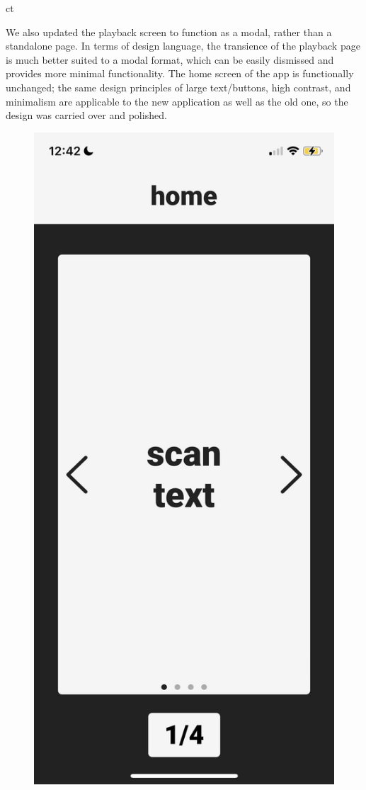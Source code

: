 ct\documentclass[a4paper,11pt]{article}
\begin{document}
We also updated the playback screen to function as a modal, rather than a standalone page. In terms of design language, the transience of the playback page is much better suited to a modal format, which can be easily dismissed and provides more minimal functionality. The home screen of the app is functionally unchanged; the same design principles of large text/buttons, high contrast, and minimalism are applicable to the new application as well as the old one, so the design was carried over and polished.

\begin{figure}[H]
\centering
\includegraphics[scale=0.2]{img/app/landing.png}

\end{figure}
\end{document}
